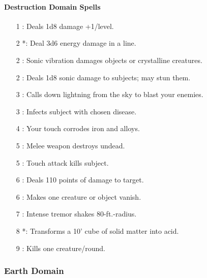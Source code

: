 \paragraph{Destruction Domain Spells}
\begin{itemize}
\item[1] : Deals 1d8 damage +1/level.
\item[2] *: Deal 3d6 energy damage in a line.
\item[2] : Sonic vibration damages objects or crystalline creatures.
\item[2] : Deals 1d8 sonic damage to subjects; may stun them.
\item[3] : Calls down lightning from the sky to blast your enemies.
\item[3] : Infects subject with chosen disease.
\item[4] : Your touch corrodes iron and alloys.
\item[5] : Melee weapon destroys undead.
\item[5] : Touch attack kills subject.
\item[6] : Deals 110 points of damage to target.
\item[6] : Makes one creature or object vanish.
\item[7] : Intense tremor shakes 80-ft.-radius.
\item[8] *: Transforms a 10' cube of solid matter into acid.
\item[9] : Kills one creature/round.
\end{itemize}
\subsubsection{Earth Domain}
